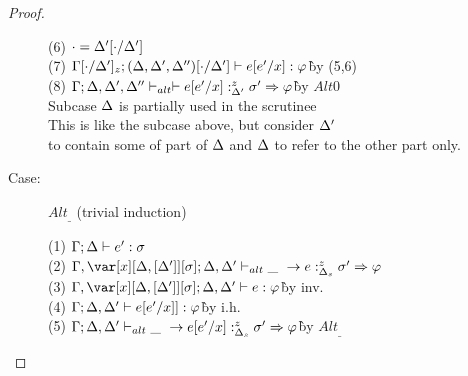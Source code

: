 \begin{proof}
\begin{description}
\begin{tabbing}
    (6) $\cdot = \Delta'[\cdot/\Delta']$\\
    (7) $\Gamma[\cdot/\Delta']_z; (\Delta,\Delta',\Delta'')[\cdot/\Delta'] \vdash e[e'/x] : \varphi$\` by (5,6)\\
    (8) $\Gamma;\Delta,\Delta',\Delta'' \vdash_{alt} \vdash e[e'/x] :^z_{\Delta'} \sigma' \Rightarrow \varphi$\`by $Alt0$\\
    Subcase $\Delta$ is partially used in the scrutinee\\
    This is like the subcase above, but consider $\Delta'$\\
    to contain some of part of $\Delta$ and $\Delta$ to refer to the other part only.
\end{tabbing}

\item[Case:] $Alt_\_$ (trivial induction)
\begin{tabbing}
    (1) $\Gamma;\Delta \vdash e' : \sigma$\\
    (2) $\G,\xD; \D,\D' \vdash_{alt} \_~\to e :^z_{\D_s} \s' \Rightarrow \vp$\\
    (3) $\G,\xD; \D,\D' \vdash e : \vp$\` by inv.\\
    (4) $\Gamma; \Delta, \Delta' \vdash e[e'/x]] : \varphi$\` by i.h.\\
    (5) $\Gamma; \Delta,\Delta' \vdash_{alt} \_~\to e[e'/x] :^z_{\Delta_s} \sigma' \Rightarrow \varphi$\` by $Alt_\_$\\
\end{tabbing}
\end{description}

\end{proof}

